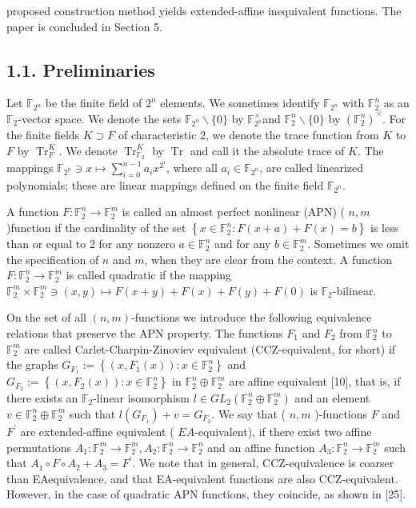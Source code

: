 \documentclass[10pt]{article}
\begin{document}
proposed construction method yields extended-affine inequivalent functions. The paper is concluded in Section 5.

\subsection*{1.1. Preliminaries}
Let $\mathbb{F}_{2^{n}}$ be the finite field of $2^{n}$ elements. We sometimes identify $\mathbb{F}_{2^{n}}$ with $\mathbb{F}_{2}^{n}$ as an $\mathbb{F}_{2}$-vector space. We denote the sets $\mathbb{F}_{2^{n}} \backslash\{0\}$ by $\mathbb{F}_{2^{n}}^{\times}$and $\mathbb{F}_{2}^{n} \backslash\{0\}$ by $\left(\mathbb{F}_{2}^{n}\right)^{\times}$. For the finite fields $K \supset F$ of characteristic 2, we denote the trace function from $K$ to $F$ by $\operatorname{Tr}_{F}^{K}$. We denote $\operatorname{Tr}_{\mathbb{F}_{2}}^{K}$ by $\operatorname{Tr}$ and call it the absolute trace of $K$. The mappings $\mathbb{F}_{2^{n}} \ni x \mapsto \sum_{i=0}^{n-1} a_{i} x^{2^{i}}$, where all $a_{i} \in \mathbb{F}_{2^{n}}$, are called linearized polynomials; these are linear mappings defined on the finite field $\mathbb{F}_{2^{n}}$.

A function $F: \mathbb{F}_{2}^{n} \rightarrow \mathbb{F}_{2}^{m}$ is called an almost perfect nonlinear (APN) ( $n, m$ )function if the cardinality of the set $\left\{x \in \mathbb{F}_{2}^{n}: F(x+a)+F(x)=b\right\}$ is less than or equal to 2 for any nonzero $a \in \mathbb{F}_{2}^{n}$ and for any $b \in \mathbb{F}_{2}^{m}$. Sometimes we omit the specification of $n$ and $m$, when they are clear from the context. A function $F: \mathbb{F}_{2}^{n} \rightarrow \mathbb{F}_{2}^{m}$ is called quadratic if the mapping $\mathbb{F}_{2}^{m} \times \mathbb{F}_{2}^{m} \ni(x, y) \mapsto F(x+y)+F(x)+F(y)+F(0)$ is $\mathbb{F}_{2}$-bilinear.

On the set of all $(n, m)$-functions we introduce the following equivalence relations that preserve the APN property. The functions $F_{1}$ and $F_{2}$ from $\mathbb{F}_{2}^{n}$ to $\mathbb{F}_{2}^{m}$ are called Carlet-Charpin-Zinoviev equivalent (CCZ-equivalent, for short) if the graphs $G_{F_{1}}:=\left\{\left(x, F_{1}(x)\right): x \in \mathbb{F}_{2}^{n}\right\}$ and $G_{F_{2}}:=\left\{\left(x, F_{2}(x)\right): x \in \mathbb{F}_{2}^{n}\right\}$ in $\mathbb{F}_{2}^{n} \oplus \mathbb{F}_{2}^{m}$ are affine equivalent [10], that is, if there exists an $\mathbb{F}_{2}$-linear isomorphism $l \in G L_{2}\left(\mathbb{F}_{2}^{n} \oplus \mathbb{F}_{2}^{m}\right)$ and an element $v \in \mathbb{F}_{2}^{n} \oplus \mathbb{F}_{2}^{m}$ such that $l\left(G_{F_{1}}\right)+v=G_{F_{2}}$. We say that ( $n, m$ )-functions $F$ and $F^{\prime}$ are extended-affine equivalent ( $E A$-equivalent), if there exist two affine permutations $A_{1}: \mathbb{F}_{2}^{m} \rightarrow \mathbb{F}_{2}^{m}, A_{2}: \mathbb{F}_{2}^{n} \rightarrow \mathbb{F}_{2}^{n}$ and an affine function $A_{3}: \mathbb{F}_{2}^{n} \rightarrow \mathbb{F}_{2}^{m}$ such that $A_{1} \circ F \circ A_{2}+A_{3}=F^{\prime}$. We note that in general, CCZ-equivalence is coarser than EAequivalence, and that EA-equivalent functions are also CCZ-equivalent. However, in the case of quadratic APN functions, they coincide, as shown in [25].
\end{document}
